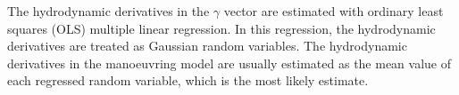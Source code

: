 The hydrodynamic derivatives in the \(\gamma\) vector are estimated with ordinary least squares (OLS) multiple linear regression.
In this regression, the hydrodynamic derivatives are treated as Gaussian random variables. The hydrodynamic derivatives in the manoeuvring model are usually estimated as the mean value of each regressed random variable, which is the most likely estimate.